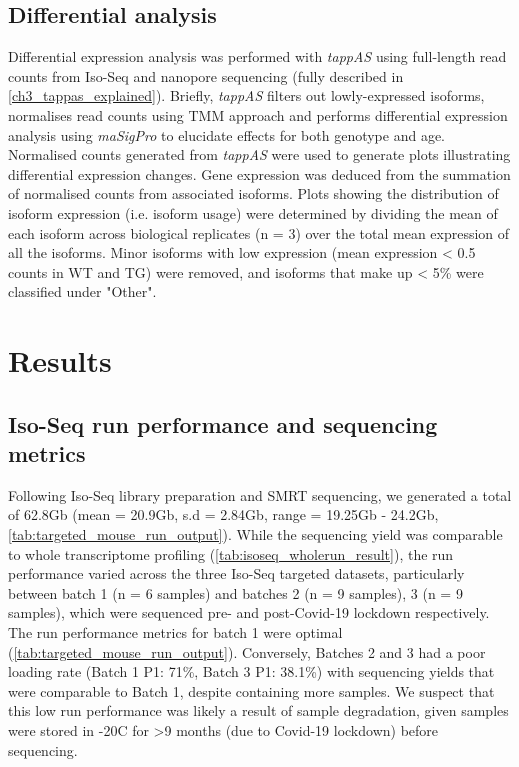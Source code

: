 \newpage
\subsection{Differential analysis}
Differential expression analysis was performed with \textit{tappAS} using full-length read counts from Iso-Seq and nanopore sequencing (fully described in \cref{ch3_tappas_explained}). Briefly, \textit{tappAS} filters out lowly-expressed isoforms, normalises read counts using TMM approach and performs differential expression analysis using \textit{maSigPro}\cite{Conesa2006,Nueda2014,Conesa2017} to elucidate effects for both genotype and age. Normalised counts generated from \textit{tappAS} were used to generate plots illustrating differential expression changes. Gene expression was deduced from the summation of normalised counts from associated isoforms. Plots showing the distribution of isoform expression (i.e. isoform usage) were determined by dividing the mean of each isoform across biological replicates (n = 3) over the total mean expression of all the isoforms. Minor isoforms with low expression (mean expression < 0.5 counts in WT and TG) were removed, and isoforms that make up < 5\% were classified under "Other". 

\newpage
\section{Results}
\subsection{Iso-Seq run performance and sequencing metrics}
Following Iso-Seq library preparation and SMRT sequencing, we generated a total of 62.8Gb (mean = 20.9Gb, s.d = 2.84Gb, range = 19.25Gb - 24.2Gb, \cref{tab:targeted_mouse_run_output}). While the sequencing yield was comparable to whole transcriptome profiling (\cref{tab:isoseq_wholerun_result}), the run performance varied across the three Iso-Seq targeted datasets, particularly between batch 1 (n = 6 samples) and batches 2 (n = 9 samples), 3 (n = 9 samples), which were sequenced pre- and post-Covid-19 lockdown respectively. The run performance metrics for batch 1 were optimal (\cref{tab:targeted_mouse_run_output}). Conversely, Batches 2 and 3 had a poor loading rate (Batch 1 P1:  71\%, Batch 3 P1: 38.1\%) with sequencing yields that were comparable to Batch 1, despite containing more samples. We suspect that this low run performance was likely a result of sample degradation, given samples were stored in -20\textdegree C for >9 months (due to Covid-19 lockdown) before sequencing. 

